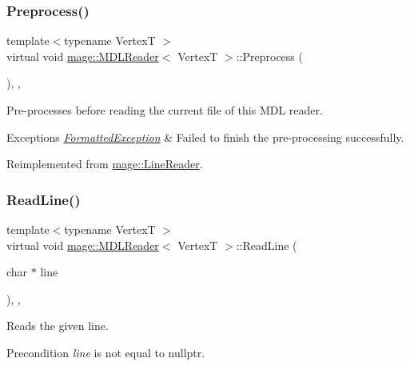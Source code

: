 \subsubsection{\texorpdfstring{Preprocess()}{Preprocess()}}
{\footnotesize\ttfamily template$<$typename VertexT $>$ \\
virtual void \hyperlink{classmage_1_1_m_d_l_reader}{mage\+::\+M\+D\+L\+Reader}$<$ VertexT $>$\+::Preprocess (\begin{DoxyParamCaption}{ }\end{DoxyParamCaption})\hspace{0.3cm}{\ttfamily [override]}, {\ttfamily [private]}, {\ttfamily [virtual]}}

Pre-\/processes before reading the current file of this M\+DL reader.


\begin{DoxyExceptions}{Exceptions}
{\em \hyperlink{structmage_1_1_formatted_exception}{Formatted\+Exception}} & Failed to finish the pre-\/processing successfully. \\
\hline
\end{DoxyExceptions}


Reimplemented from \hyperlink{classmage_1_1_line_reader_a4de135cfb0434be786cfcfd7959031ef}{mage\+::\+Line\+Reader}.

\hypertarget{classmage_1_1_m_d_l_reader_ac50f9cce64621b0a218b6778a611a702}{}\label{classmage_1_1_m_d_l_reader_ac50f9cce64621b0a218b6778a611a702} 
\subsubsection{\texorpdfstring{Read\+Line()}{ReadLine()}}
{\footnotesize\ttfamily template$<$typename VertexT $>$ \\
virtual void \hyperlink{classmage_1_1_m_d_l_reader}{mage\+::\+M\+D\+L\+Reader}$<$ VertexT $>$\+::Read\+Line (\begin{DoxyParamCaption}\item[{char $\ast$}]{line }\end{DoxyParamCaption})\hspace{0.3cm}{\ttfamily [override]}, {\ttfamily [private]}, {\ttfamily [virtual]}}

Reads the given line.

\begin{DoxyPrecond}{Precondition}
{\itshape line} is not equal to {\ttfamily nullptr}. 
\end{DoxyPrecond}

